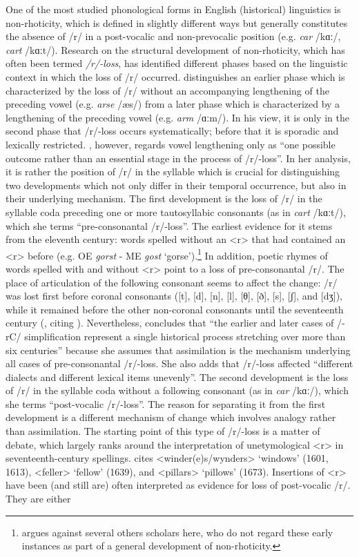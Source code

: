 One of the most studied phonological forms in English (historical) linguistics is non-rhoticity, which is defined in slightly different ways but generally constitutes the absence of /r/ in a post-vocalic and non-prevocalic position (e.g. \emph{car} /kɑː/, \emph{cart} /kɑːt/). Research on the structural development of non-rhoticity, which has often been termed \textit{/r/-loss}, has identified different phases based on the linguistic context in which the loss of /r/ occurred. \citet[91--92]{Lass2006} distinguishes an earlier phase which is characterized by the loss of /r/ without an accompanying lengthening of the preceding vowel (e.g. \emph{arse} /æs/) from a later phase which is characterized by a lengthening of the preceding vowel (e.g. \textit{arm} /ɑːm/). In his view, it is only in the second phase that /r/-loss occurs systematically; before that it is sporadic and lexically restricted. \citet[124]{Minkova2014}, however, regards vowel lengthening only as “one possible outcome rather than an essential stage in the process of /r/-loss”. In her analysis, it is rather the position of /r/ in the syllable which is crucial for distinguishing two developments which not only differ in their temporal occurrence, but also in their underlying mechanism. The first development is the loss of /r/ in the syllable coda preceding one or more tautosyllabic consonants (as in \emph{cart} /kɑːt/), which she terms “pre-consonantal /r/-loss”. The earliest evidence for it stems from the eleventh century: words spelled without an <r> that had contained an <r> before (e.g. OE \textit{gorst} - ME \textit{gost} ‘gorse’).\footnote{\citet{Minkova2014} argues against several others scholars here, who do not regard these early instances as part of a general development of non-rhoticity.} In addition, poetic rhymes of words spelled with and without <r> point to a loss of pre-consonantal /r/. The place of articulation of the following consonant seems to affect the change: /r/ was lost first before coronal consonants ([t], [d], [n], [l], [θ], [ð], [s], [ʃ], and [dʒ]), while it remained before the other non-coronal consonants until the seventeenth century (\citealt[122]{Minkova2014}, citing \citealt{Hill1940}). Nevertheless, \citet[124]{Minkova2014} concludes that “the earlier and later cases of /-rC/ simplification represent a single historical process stretching over more than six centuries” because she assumes that assimilation is the mechanism underlying all cases of pre-consonantal /r/-loss. She also adds that /r/-loss affected “different dialects and different lexical items unevenly”. The second development is the loss of /r/ in the syllable coda without a following consonant (as in \emph{car} /kɑː/), which she terms “post-vocalic /r/-loss”. The reason for separating it from the first development is a different mechanism of change which involves analogy rather than assimilation. The starting point of this type of /r/-loss is a matter of debate, which largely ranks around the interpretation of unetymological <r> in seventeenth-century spellings. \citet[126]{Minkova2014} cites <winder(e)s/wynders> ‘windows’ (1601, 1613), <feller> ‘fellow’ (1639), and <pillars> ‘pillows’ (1673). Insertions of <r> have been (and still are) often interpreted as evidence for loss of post-vocalic /r/. They are either 
